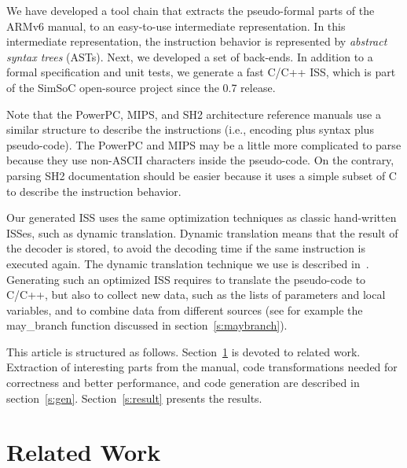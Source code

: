 \documentclass[conference]{ieeeconf}
\begin{document}
We have developed a tool chain that extracts the pseudo-formal parts of the
ARMv6 manual, to an easy-to-use intermediate representation. In this
intermediate representation, the instruction behavior is represented by {\em
  abstract syntax trees} (ASTs). Next, we developed a set of back-ends. In
addition to a formal specification and unit tests, we generate a fast C/C++ ISS,
which is part of the SimSoC open-source project since the 0.7 release.

Note that the PowerPC, MIPS, and SH2 architecture reference manuals use a
similar structure to describe the instructions (i.e., encoding plus syntax plus
pseudo-code). The PowerPC and MIPS may be a little more complicated to parse
because they use non-ASCII characters inside the pseudo-code. On the contrary,
parsing SH2 documentation should be easier because it uses a simple subset of C
to describe the instruction behavior.

Our generated ISS uses the same optimization techniques as classic
hand-written ISSes, such as dynamic translation. Dynamic translation means that
the result of the decoder is stored, to avoid the decoding time if the same
instruction is executed again.
The dynamic translation technique we use is described in~\cite{ossc09}.
Generating such an optimized ISS requires to translate the pseudo-code to C/C++, but
also to collect new data, such as the lists of parameters and local variables,
and to combine data from different sources (see for example the {\stt
  may\_branch} function discussed in section~\ref{s:maybranch}).



This article is structured as follows. Section~\ref{s:rw} is devoted to related
work. Extraction of interesting parts from the manual, code transformations
needed for correctness and better performance, and code generation are described
in section~\ref{s:gen}. Section~\ref{s:result} presents the results.


\section{Related Work} %
\label{s:rw}
\end{document}
